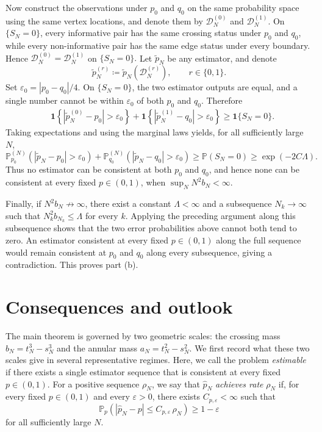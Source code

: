 \documentclass[ECP,preprint]{ejpecp} %
\newcommand{\1}{\mathbf 1}
\newcommand{\PP}{\mathbb P}
\newcommand{\cD}{\mathcal D}
\begin{document}
Now construct the observations under \(p_0\) and \(q_0\) on the same probability space using the same vertex locations, and denote them by \(\cD_N^{(0)}\) and \(\cD_N^{(1)}\). On \(\{S_N=0\}\), every informative pair has the same crossing status under \(p_0\) and \(q_0\), while every non-informative pair has the same edge status under every boundary.
Hence
\(
    \cD_N^{(0)}=\cD_N^{(1)}
\)
on
\(
    \{S_N=0\}.
\)
%
Let \(\widetilde p_N\) be any estimator, and denote
\[
    \widetilde p_N^{(r)}
    \coloneqq
    \widetilde p_N(\cD_N^{(r)}),
    \qquad r\in\{0,1\}.
\]
Set
\(
    \varepsilon_0
    =
    {|p_0-q_0|}/{4}.
\)
On \(\{S_N=0\}\), the two estimator outputs are equal, and a single
number cannot be within \(\varepsilon_0\) of both \(p_0\) and \(q_0\).
Therefore
\[
\begin{aligned}
    &\1\left\{
        |\widetilde p_N^{(0)}-p_0|>\varepsilon_0
    \right\}
    +
    \1\left\{
        |\widetilde p_N^{(1)}-q_0|>\varepsilon_0
    \right\}
    \ge
    \1\{S_N=0\}.
\end{aligned}
\]
Taking expectations and using the marginal laws yields,
for all sufficiently large \(N\),
\[
    \PP_{p_0}^{(N)}
        \left(|\widetilde p_N-p_0|>\varepsilon_0\right)
    +
    \PP_{q_0}^{(N)}
        \left(|\widetilde p_N-q_0|>\varepsilon_0\right) 
    \ge
    \PP(S_N=0)
    \ge
    \exp(-2C\Lambda).
\]
Thus no estimator can be consistent at both \(p_0\) and \(q_0\), and
hence none can be consistent at every fixed \(p\in(0,1)\), when
\(\sup_NN^2b_N<\infty\).

Finally, if \(N^2b_N\not\to\infty\), there exist a constant
\(\Lambda<\infty\) and a subsequence \(N_k\to\infty\) such that
\(
    N_k^2b_{N_k}\le\Lambda
\)
for every \(k\). Applying the preceding argument along this subsequence shows that the two error probabilities above cannot both tend to zero. An estimator consistent at every fixed \(p\in(0,1)\) along the full sequence would remain consistent at \(p_0\) and \(q_0\) along every subsequence, giving a contradiction. This proves part (b).

\section{Consequences and outlook}

The main theorem is governed by two geometric scales: the crossing mass
\(
    b_N=t_N^3-s_N^3
\)
and the annular mass
\(
    a_N=t_N^2-s_N^2.
\)
We first record what these two scales give in several representative regimes. Here, we call the problem \emph{estimable} if there exists a single estimator sequence that is consistent at every fixed \(p\in(0,1)\).  For a positive sequence \(\rho_N\), we say that \(\widehat p_N\) \emph{achieves rate} \(\rho_N\) if, for every fixed \(p\in(0,1)\) and every \(\varepsilon>0\), there exists \(C_{p,\varepsilon}<\infty\) such that
\[
    \PP_p\left(
        |\widehat p_N-p|
        \le C_{p,\varepsilon} \, \rho_N
    \right)
    \ge 1-\varepsilon
\]
for all sufficiently large \(N\).
\end{document}
